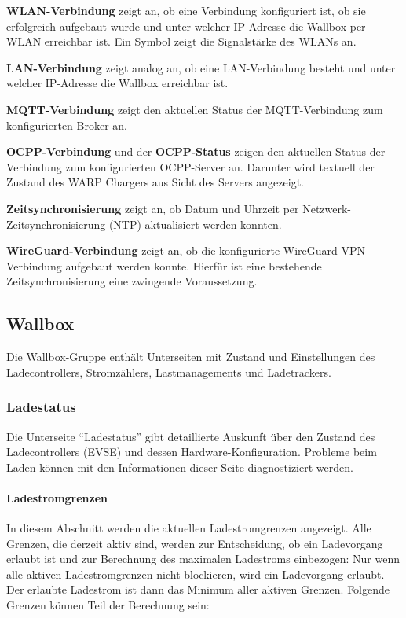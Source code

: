 \documentclass[a4paper,10pt]{article}
\begin{document}
\begin{multicols*}{2}
    \textbf{WLAN-Verbindung} zeigt an, ob eine Verbindung konfiguriert ist, ob sie erfolgreich aufgebaut wurde und
    unter welcher IP-Adresse die Wallbox per WLAN erreichbar ist. Ein Symbol
    zeigt die Signalstärke des WLANs an.

    \textbf{LAN-Verbindung} zeigt analog an, ob eine LAN-Verbindung besteht und unter welcher IP-Adresse die Wallbox erreichbar ist.

    \textbf{MQTT-Verbindung} zeigt den aktuellen Status der MQTT-Verbindung
    zum konfigurierten Broker an.

    \textbf{OCPP-Verbindung} und der \textbf{OCPP-Status} zeigen den aktuellen Status der Verbindung zum konfigurierten OCPP-Server an.
    Darunter wird textuell der Zustand des WARP Chargers aus Sicht des Servers angezeigt.

    \textbf{Zeitsynchronisierung} zeigt an, ob Datum und Uhrzeit per Netzwerk-Zeitsynchronisierung (NTP) aktualisiert werden konnten.

    \textbf{WireGuard-Verbindung} zeigt an, ob die konfigurierte WireGuard-VPN-Verbindung aufgebaut werden konnte. Hierfür ist eine bestehende Zeitsynchronisierung eine zwingende Voraussetzung.

    \subsection{Wallbox}
    Die Wallbox-Gruppe enthält Unterseiten mit Zustand und Einstellungen des Ladecontrollers, Stromzählers, Lastmanagements und Ladetrackers.

    \vspace{-0.3cm}
    \subsubsection{Ladestatus}\label{evse}
    \vspace{-0.1cm}
    Die Unterseite \enquote{Ladestatus} gibt detaillierte Auskunft über den Zustand
    des Ladecontrollers (EVSE) und dessen Hardware-Konfiguration. Probleme beim Laden
    können mit den Informationen dieser Seite diagnostiziert werden.

    \vspace{-0.4cm}
    \paragraph{Ladestromgrenzen}
    In diesem Abschnitt werden die aktuellen Ladestromgrenzen angezeigt. Alle Grenzen, die
    derzeit aktiv sind, werden zur Entscheidung, ob ein Ladevorgang erlaubt ist und zur Berechnung des maximalen Ladestroms einbezogen:
    Nur wenn alle aktiven Ladestromgrenzen nicht blockieren, wird ein Ladevorgang erlaubt.
    Der erlaubte Ladestrom ist dann das Minimum aller aktiven Grenzen. Folgende Grenzen können Teil der Berechnung sein:


\end{multicols*}
\end{document}

